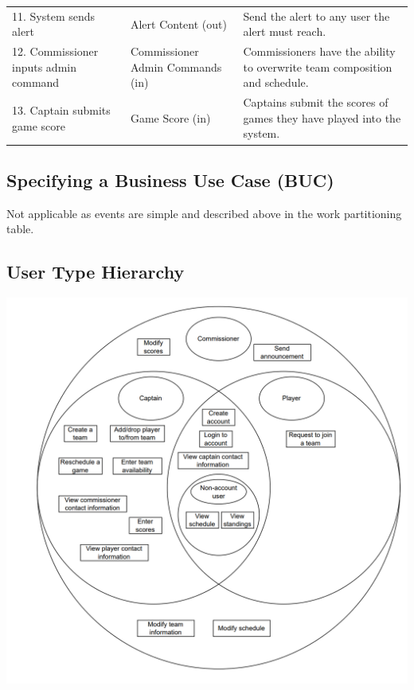 \documentclass[12pt]{article}
\begin{document}
  \begin{center}
    \begin{tabular}{|m{4cm}|m{4cm}|m{6cm}|}
      \hline
      11. System sends alert & Alert Content (out) & Send the alert to any user the
      alert must reach.\\
      12. Commissioner inputs admin command & Commissioner Admin Commands (in)
      & Commissioners have the ability to overwrite team composition and
      schedule.\\
      13. Captain submits game score & Game Score (in)
      & Captains submit the scores of games they have played into the
      system.\\
      \hline
    \end{tabular}
  \end{center}

\subsection{Specifying a Business Use Case (BUC)}
Not applicable as events are simple and described above
in the work partitioning table.

\subsection{User Type Hierarchy}
\includegraphics[scale=1.0]{business_data_model.png}
\end{document}

